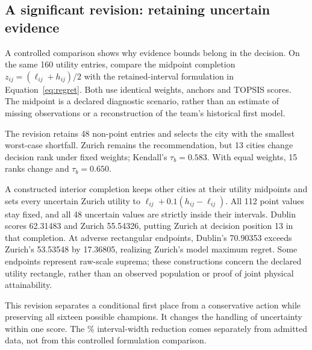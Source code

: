 \subsection{A significant revision: retaining uncertain evidence}
A controlled comparison shows why evidence bounds belong in the decision.
On the same 160 utility entries, compare the midpoint completion $z_{ij}=(\ell_{ij}+h_{ij})/2$ with the retained-interval formulation in Equation~\ref{eq:regret}. Both use identical weights, anchors and TOPSIS scores. The midpoint is a declared diagnostic scenario, rather than an estimate of missing observations or a reconstruction of the team's historical first model.

The revision retains 48 non-point entries and selects the city with the smallest worst-case shortfall. Zurich remains the recommendation, but 13 cities change decision rank under fixed weights; Kendall's $\tau_b=0.583$. With equal weights, 15 ranks change and $\tau_b=0.650$.

A constructed interior completion keeps other cities at their utility midpoints and sets every uncertain Zurich utility to $\ell_{ij}+0.1(h_{ij}-\ell_{ij})$. All 112 point values stay fixed, and all 48 uncertain values are strictly inside their intervals. Dublin scores 62.31483 and Zurich 55.54326, putting Zurich at decision position 13 in that completion. At adverse rectangular endpoints, Dublin's 70.90353 exceeds Zurich's 53.53548 by 17.36805, realizing Zurich's model maximum regret. Some endpoints represent raw-scale suprema; these constructions concern the declared utility rectangle, rather than an observed population or proof of joint physical attainability.

This revision separates a conditional first place from a conservative action while preserving all sixteen possible champions. It changes the handling of uncertainty within one score. The \TotalWidthReduction\% interval-width reduction comes separately from admitted data, not from this controlled formulation comparison.
